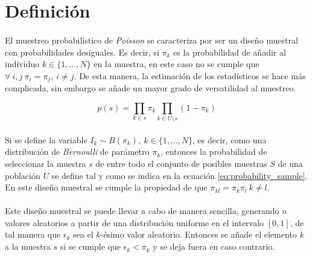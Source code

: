 \documentclass{article}
\begin{document}
	\maketitle
  \thispagestyle{empty}

  \section{Definición}
  \label{sec:definition}

    \paragraph{}
    El muestreo probabilístico de \emph{Poisson} se caracteriza por ser un diseño muestral con probabilidades desiguales. Es decir, si $\pi_k$ es la probabilidad de añadir al individuo $k \in \{1, ..., N\}$ en la muestra, en este caso no se cumple que $\forall \ i,j \ \pi_i = \pi_j, \ i \neq j$. De esta manera, la estimación de los estadísticos se hace más complicada, sin embargo se añade un mayor grado de versatilidad al muestreo.

    \begin{equation}
    \label{eq:probability_sample}
      p(s) = \prod_{k\in s} \pi_k \prod_{k \in U \setminus  s} (1-\pi_k)
    \end{equation}

    \paragraph{}
    Si se define la variable $I_k \sim B(\pi_k), \ k \in \{1, ..., N\}$, es decir, como una distribución de \emph{Bernoulli} de parámetro $\pi_k$, entonces la probabilidad de seleccionar la muestra $s$ de entre todo el conjunto de posibles muestras $S$ de una población $U$ se define tal y como se indica en la ecuación \eqref{eq:probability_sample}. En este diseño muestral se cumple la propiedad de que $\pi_{kl} = \pi_k\pi_l \ k \neq l$.

    \paragraph{}
    Este diseño muestral se puede llevar a cabo de manera sencilla, generando $n$ valores aleatorios a partir de una distribución uniforme en el intervalo $[0,1]$, de tal manera que $\epsilon_k$ sea el $k$-ésimo valor aleatorio. Entonces se añade el elemento $k$ a la muestra $s$ si se cumple que $\epsilon_k < \pi_k$ y se deja fuera en caso contrario.
\end{document}
